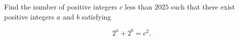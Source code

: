 Find the number of positive integers $c$ less than $2025$ such that there exist positive integers $a$ and $b$ satisfying

$$2^a+2^b=c^2.$$
